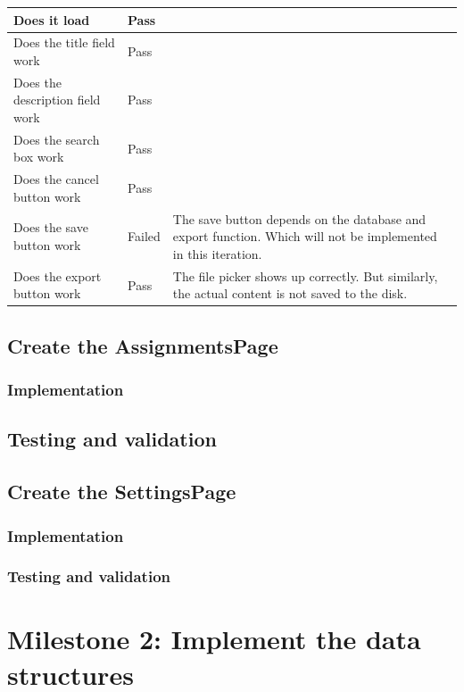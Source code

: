 \documentclass[a4paper]{report}
\begin{document}
\begin{tabulary}{\linewidth}{|L|l|L|}
    \hline
    Does it load & Pass & \\
    \hline
    Does the title field work & Pass & \\
    \hline
    Does the description field work & Pass & \\
    \hline
    Does the search box work & Pass & \\
    \hline
    Does the cancel button work & Pass & \\
    \hline
    Does the save button work & Failed & The save button depends on the database and export function. Which will not be implemented in this iteration. \\
    \hline
    Does the export button work & Pass & The file picker shows up correctly. But similarly, the actual content is not saved to the disk.
    \hline
\end{tabulary}

\subsection{Create the AssignmentsPage}

\subsubsection{Implementation}

\subsection{Testing and validation}

\subsection{Create the SettingsPage}

\subsubsection{Implementation}

\subsubsection{Testing and validation}

\section{Milestone 2: Implement the data structures}
\end{document}
